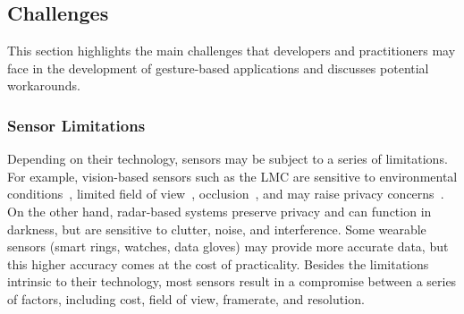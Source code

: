 

\subsection{Challenges} \label{sec:state_of_the_art:overview:challenges}
This section highlights the main challenges that developers and practitioners may face in the development of gesture-based applications and discusses potential workarounds.


\subsubsection{Sensor Limitations} \label{sec:state_of_the_art:overview:challenges:sensors-limitations}
Depending on their technology, sensors may be subject to a series of limitations. For example, vision-based sensors such as the LMC are sensitive to environmental conditions~\cite{Yeo:2017}, limited field of view~\cite{Hayashi:2021}, occlusion~\cite{Brandon:2014}, and may raise privacy concerns~\cite{Avrahami:2018}. On the other hand, radar-based systems preserve privacy and can function in darkness, but are sensitive to clutter, noise, and interference. Some wearable sensors (\eg smart rings, watches, data gloves) may provide more accurate data, but this higher accuracy comes at the cost of practicality. Besides the limitations intrinsic to their technology, most sensors result in a compromise between a series of factors, including cost, field of view, framerate, and resolution.

